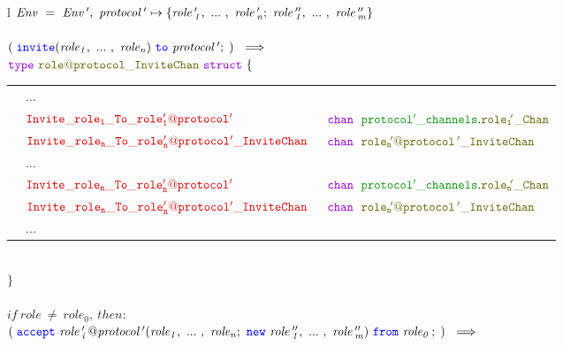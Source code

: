 \documentclass[12pt,twoside]{report}
\begin{document}
\begin{figure}[!h]
    \begin{center}
        \begin{tabular}{l}
            $\mathit{Env\ =\ Env\,',\ protocol\,' \mapsto \{\roles{role\,'}{n};\ \roles{role\,''}{m}\}}$\\\\

            $(\;\invite(\roles{role}{n})\ \scrto\ \mathit{protocol\,'};\;)\ \implies$\\[6pt]

            {\footnotesize
            $\gotype\ \structname{\localprotocol{role}{protocol}\_InviteChan}\ \gostruct\ \{$}\\[3pt]
            {\footnotesize
            \begin{tabular}{lll}
                
                \indent & $\dots$ & \\[9pt]
                \indent & $\structfield{Invite\_role_1\_To\_\localprotocol{role'_1}{protocol'}}$\ &$\gochan\ \;\pkgstructaccess{protocol'\_channels}{role_1\!'\_Chan}$\\
                \indent & $\structfield{Invite\_role_n\_To\_\localprotocol{role'_n}{protocol'}\_InviteChan}$\ &$\gochan\ \; \structname{\localprotocol{role_n\!'}{protocol\,'}\_InviteChan}$\\
                \indent & $\dots$ & \\
                \indent & $\structfield{Invite\_role_n\_To\_\localprotocol{role'_n}{protocol'}}$\ &$\gochan\ \;\pkgstructaccess{protocol'\_channels}{role_n\!'\_Chan}$\\
                \indent & $\structfield{Invite\_role_n\_To\_\localprotocol{role'_n}{protocol'}\_InviteChan}$\ &$\gochan\ \; \structname{\localprotocol{role_n\!'}{protocol\,'}\_InviteChan}$\\[7pt]
                \indent & $\dots$ & 
            \end{tabular}}\\
            {\footnotesize$\}$}\\\\[5pt]


            $\mathit{if\ role\ \neq\ role_0},\ then:$\\[6pt]
            $(\;\accept\ \mathit{\localprotocol{role\,'_i\,}{protocol}\,'}(\roles{role}{n};\ \scrnew\ \roles{role\,''}{m})\ \from\ \mathit{role_0}\,;\;)\ \implies$\\[6pt]
            

\end{tabular}
\end{center}
\end{figure}
\end{document}
